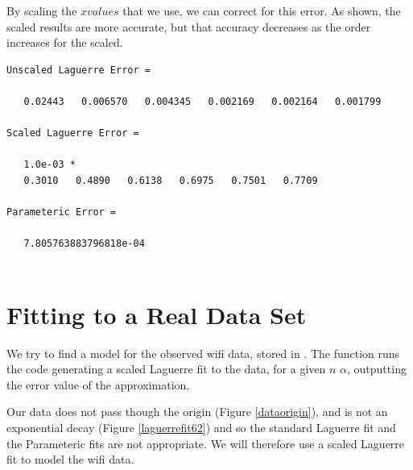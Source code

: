 \documentclass{article}
\begin{document}
By scaling the $x values$ that we use, we can correct for this error. As shown, the scaled results  are more accurate, but that accuracy decreases as the order increases for the scaled. 

\begin{lstlisting}
Unscaled Laguerre Error =

   0.02443   0.006570   0.004345   0.002169   0.002164   0.001799

Scaled Laguerre Error =

   1.0e-03 *
   0.3010   0.4890   0.6138   0.6975   0.7501   0.7709
   
Parameteric Error =

   7.805763883796818e-04
   
\end{lstlisting}











\section{Fitting to a Real Data Set}

We try to find a model for the observed wifi data, stored in . The function  runs the code generating a scaled Laguerre fit to the data, for a given $n$ $\alpha$, outputting the error value of the approximation. 

Our data does not pass though the origin (Figure \ref{dataorigin}), and is not an exponential decay (Figure \ref{laguerrefit62}) and so the standard Laguerre fit and the Parameteric fits are not appropriate. We will therefore use a scaled Laguerre fit to model the wifi data. 
\end{document}

